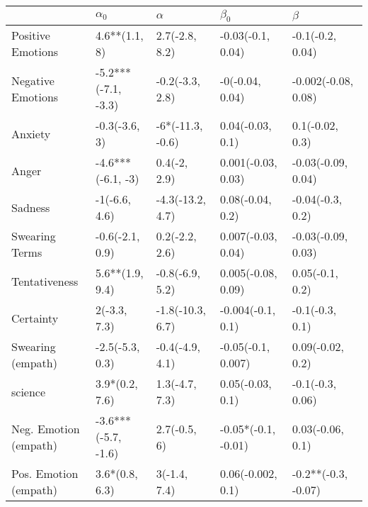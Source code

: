 \begin{tabular}{lllll}
\toprule
{} &           $\alpha_0$ &          $\alpha$ &            $\beta_0$ &              $\beta$ \\
\midrule
Positive Emotions     &        4.6**(1.1, 8) &    2.7(-2.8, 8.2) &    -0.03(-0.1, 0.04) &     -0.1(-0.2, 0.04) \\
Negative Emotions     &  -5.2***(-7.1, -3.3) &   -0.2(-3.3, 2.8) &      -0(-0.04, 0.04) &  -0.002(-0.08, 0.08) \\
Anxiety               &        -0.3(-3.6, 3) &  -6*(-11.3, -0.6) &     0.04(-0.03, 0.1) &      0.1(-0.02, 0.3) \\
Anger                 &    -4.6***(-6.1, -3) &      0.4(-2, 2.9) &   0.001(-0.03, 0.03) &   -0.03(-0.09, 0.04) \\
Sadness               &        -1(-6.6, 4.6) &  -4.3(-13.2, 4.7) &     0.08(-0.04, 0.2) &     -0.04(-0.3, 0.2) \\
Swearing Terms        &      -0.6(-2.1, 0.9) &    0.2(-2.2, 2.6) &   0.007(-0.03, 0.04) &   -0.03(-0.09, 0.03) \\
Tentativeness         &      5.6**(1.9, 9.4) &   -0.8(-6.9, 5.2) &   0.005(-0.08, 0.09) &      0.05(-0.1, 0.2) \\
Certainty             &         2(-3.3, 7.3) &  -1.8(-10.3, 6.7) &    -0.004(-0.1, 0.1) &      -0.1(-0.3, 0.1) \\
Swearing (empath)     &      -2.5(-5.3, 0.3) &   -0.4(-4.9, 4.1) &   -0.05(-0.1, 0.007) &     0.09(-0.02, 0.2) \\
science               &       3.9*(0.2, 7.6) &    1.3(-4.7, 7.3) &     0.05(-0.03, 0.1) &     -0.1(-0.3, 0.06) \\
Neg. Emotion (empath) &  -3.6***(-5.7, -1.6) &      2.7(-0.5, 6) &  -0.05*(-0.1, -0.01) &     0.03(-0.06, 0.1) \\
Pos. Emotion (empath) &       3.6*(0.8, 6.3) &      3(-1.4, 7.4) &    0.06(-0.002, 0.1) &  -0.2**(-0.3, -0.07) \\
\bottomrule
\end{tabular}
